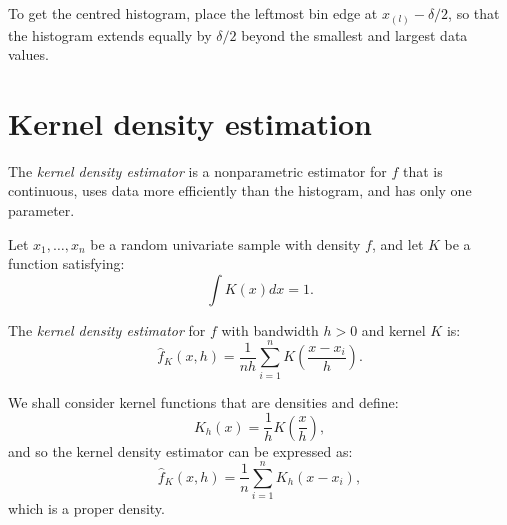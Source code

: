 To get the centred histogram, place the leftmost bin edge at $x_{(l)}-\delta/2$, so that the histogram extends equally by $\delta/2$ beyond the smallest and largest data values.

\section{Kernel density estimation}
The {\it kernel density estimator} is a nonparametric estimator for $f$ that is continuous, uses data more efficiently than the histogram, and has only one parameter.

\begin{definition}
Let $x_1,\ldots,x_n$ be a random univariate sample with density $f$, and let $K$ be a function satisfying:
\begin{equation}
\int K(x)dx=1.
\end{equation}

The {\it kernel density estimator} for $f$ with bandwidth $h > 0$ and kernel $K$ is:
\begin{equation}
\hat{f}_K(x,h)=\frac{1}{nh}\sum^n_{i=1}K\left(\frac{x-x_i}{h}\right).
\end{equation}

We shall consider kernel functions that are densities and define:
\begin{equation}
K_h(x)=\frac{1}{h}K\left(\frac{x}{h}\right),
\end{equation}
and so the kernel density estimator can be expressed as:
\begin{equation}
\hat{f}_K(x,h)=\frac{1}{n}\sum^n_{i=1}K_h(x-x_i),
\end{equation}
which is a proper density.
\end{definition}

